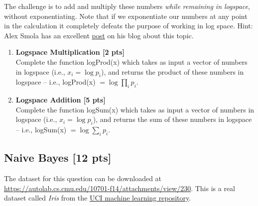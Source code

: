 The challenge is to add and multiply these numbers \emph{while remaining in logspace}, without exponentiating. Note that if we exponentiate our numbers at any point in the calculation it completely defeats the purpose of working in log space. Hint: Alex Smola has an excellent \href{http://blog.smola.org/post/987977550/log-probabilities-semirings-and-floating-point-numbers}{post} on his blog about this topic.
\begin{enumerate}
\item \textbf{Logspace Multiplication [2 pts]}\\
Complete the function \textsf{logProd(x)} which takes as input a vector of numbers in logspace (i.e., $x_i = \log p_i$), and returns the product of these numbers in logspace -- i.e., \textsf{logProd(x)} $= \log \prod_i p_i$.
\item \textbf{Logspace Addition [5 pts]}\\
Complete the function \textsf{logSum(x)} which takes as input a vector of numbers in logspace (i.e., $x_i = \log p_i$), and returns the sum of these numbers in logspace -- i.e., \textsf{logSum(x)} $= \log \sum_i p_i$.
\end{enumerate}

\subsection*{Naive Bayes [12 pts]}
The dataset for this question can be downloaded at \url{https://autolab.cs.cmu.edu/10701-f14/attachments/view/230}. This is a real dataset called \emph{Iris} from the \href{http://archive.ics.uci.edu/ml/datasets/iris}{UCI machine learning repository}.

